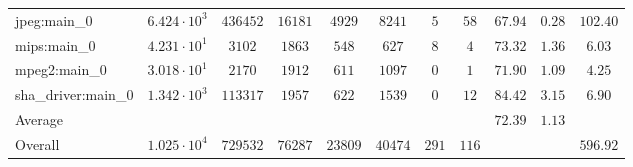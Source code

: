 \begin{tabular}{|l|c|c|c|c|c|c|c|c|c|c|}
jpeg:main\_0            & $ 6.424 \cdot 10^{3} $ & $ 436452 $ & $ 16181 $ & $ 4929  $ & $ 8241  $ & $ 5   $ & $ 58  $ & $ 67.94       $ & $ 0.28    $ & $ 102.40  $ \\
mips:main\_0            & $ 4.231 \cdot 10^{1} $ & $ 3102   $ & $ 1863  $ & $ 548   $ & $ 627   $ & $ 8   $ & $ 4   $ & $ 73.32       $ & $ 1.36    $ & $ 6.03    $ \\
mpeg2:main\_0           & $ 3.018 \cdot 10^{1} $ & $ 2170   $ & $ 1912  $ & $ 611   $ & $ 1097  $ & $ 0   $ & $ 1   $ & $ 71.90       $ & $ 1.09    $ & $ 4.25    $ \\
sha\_driver:main\_0     & $ 1.342 \cdot 10^{3} $ & $ 113317 $ & $ 1957  $ & $ 622   $ & $ 1539  $ & $ 0   $ & $ 12  $ & $ 84.42       $ & $ 3.15    $ & $ 6.90    $ \\
\hline
Average                 & $                    $ & $        $ & $       $ & $       $ & $       $ & $     $ & $     $ & $ 72.39       $ & $ 1.13    $ & $         $ \\
\hline
Overall                 & $ 1.025 \cdot 10^{4} $ & $ 729532 $ & $ 76287 $ & $ 23809 $ & $ 40474 $ & $ 291 $ & $ 116 $ & $             $ & $         $ & $ 596.92  $ \\
\hline
\end{tabular}
